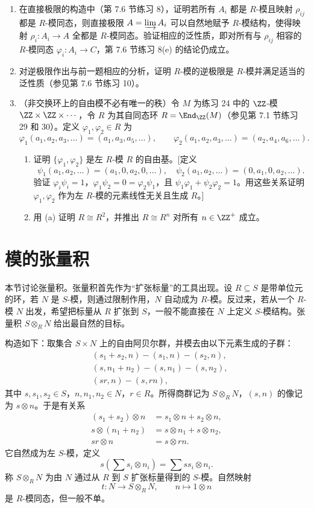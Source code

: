 \begin{enumerate}[label=\arabic*.]
	\item 在直接极限的构造中（第 7.6 节练习 8），证明若所有 $A_i$ 都是 $R$-模且映射 $\rho_{ij}$ 都是 $R$-模同态，则直接极限 $A=\varinjlim A_i$ 可以自然地赋予 $R$-模结构，使得映射 $\rho_i:A_i\to A$ 全都是 $R$-模同态。验证相应的泛性质，即对所有与 $\rho_{ij}$ 相容的 $R$-模同态 $\varphi_i:A_i\to C$，第 7.6 节练习 8(e) 的结论仍成立。
	\item 对逆极限作出与前一题相应的分析，证明 $R$-模的逆极限是 $R$-模并满足适当的泛性质（参见第 7.6 节练习 10）。
	\item （非交换环上的自由模不必有唯一的秩）令 $M$ 为练习 24 中的 $\ZZ$-模 $\ZZ\times\ZZ\times\cdots$，令 $R$ 为其自同态环 $R=\End_{\ZZ}(M)$（参见第 7.1 节练习 29 和 30）。定义 $\varphi_1,\varphi_2\in R$ 为
	\[
	\varphi_1(a_1,a_2,a_3,\ldots)=(a_1,a_3,a_5,\ldots),
	\qquad
	\varphi_2(a_1,a_2,a_3,\ldots)=(a_2,a_4,a_6,\ldots).
	\]
	\begin{enumerate}[label=(\alph*)]
		\item 证明 $\{\varphi_1,\varphi_2\}$ 是左 $R$-模 $R$ 的自由基。[定义
		\[
		\psi_1(a_1,a_2,\ldots)=(a_1,0,a_2,0,\ldots),
		\quad
		\psi_2(a_1,a_2,\ldots)=(0,a_1,0,a_2,\ldots).
		\]
		验证 $\varphi_i\psi_i=1$，$\varphi_1\psi_2=0=\varphi_2\psi_1$，且 $\psi_1\varphi_1+\psi_2\varphi_2=1$。用这些关系证明 $\varphi_1,
		\varphi_2$ 作为左 $R$-模的元素线性无关且生成 $R$。]
		\item 用 (a) 证明 $R\cong R^2$，并推出 $R\cong R^n$ 对所有 $n\in\ZZ^+$ 成立。
	\end{enumerate}
\end{enumerate}


\section{模的张量积}

本节讨论张量积。张量积首先作为“扩张标量”的工具出现。设 $R\subseteq S$ 是带单位元的环，若 $N$ 是 $S$-模，则通过限制作用，$N$ 自动成为 $R$-模。反过来，若从一个 $R$-模 $N$ 出发，希望把标量从 $R$ 扩张到 $S$，一般不能直接在 $N$ 上定义 $S$-模结构。张量积 $S\otimes_R N$ 给出最自然的目标。

构造如下：取集合 $S\times N$ 上的自由阿贝尔群，并模去由以下元素生成的子群：
\[
\begin{aligned}
	&(s_1+s_2,n)-(s_1,n)-(s_2,n),\\
	&(s,n_1+n_2)-(s,n_1)-(s,n_2),\\
	&(sr,n)-(s,rn),
\end{aligned}
\]
其中 $s,s_1,s_2\in S$，$n,n_1,n_2\in N$，$r\in R$。所得商群记为 $S\otimes_R N$，$(s,n)$ 的像记为 $s\otimes n$。于是有关系
\[
\begin{aligned}
	(s_1+s_2)\otimes n&=s_1\otimes n+s_2\otimes n,\\
	s\otimes(n_1+n_2)&=s\otimes n_1+s\otimes n_2,\\
	sr\otimes n&=s\otimes rn.
\end{aligned}
\]
它自然成为左 $S$-模，定义
\[
s\left(\sum s_i\otimes n_i\right)=\sum ss_i\otimes n_i.
\]
称 $S\otimes_R N$ 为由 $N$ 通过从 $R$ 到 $S$ 扩张标量得到的 $S$-模。自然映射
\[
t:N\longrightarrow S\otimes_R N,
\qquad n\mapsto 1\otimes n
\]
是 $R$-模同态，但一般不单。


